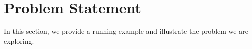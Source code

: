 \section{Problem Statement}
\label{sec:problem}


In this section, we provide a running example and illustrate the problem we are exploring.





